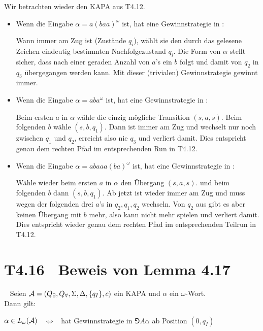 \documentclass[fontsize=11pt, twoside=false, numbers=autoenddot]{scrbook}
\begin{document}
Wir betrachten wieder den KAPA \Amc aus T4.12.
%
\parI
\begin{itemize}
  \item
    Wenn die Eingabe $\alpha = a(baa)^\omega$ ist,
    hat \PlE eine Gewinnstrategie in :
    
    \parI
    Wann immer \PlE am Zug ist (Zustände $q_i$),
    wählt sie den durch das gelesene Zeichen eindeutig bestimmten Nachfolgezustand $q_i$.
    Die Form von $\alpha$ stellt sicher, dass nach einer geraden Anzahl von $a$'s
    ein $b$ folgt und damit von $q_2$ in $q_3$ übergegangen werden kann.
    Mit dieser (trivialen) Gewinnstrategie gewinnt \PlE immer.
    \parI
  \item
    Wenn die Eingabe $\alpha = aba^\omega$ ist,
    hat \PlA eine Gewinnstrategie in :
    
    \parI
    Beim ersten $a$ in $\alpha$ wähle die einzig mögliche Transition $(s,a,s)$.
    Beim folgenden $b$ wähle $(s,b,q_1)$.
    Dann ist \PlE immer am Zug und wechselt nur noch zwischen $q_1$ und $q_2$,
    erreicht also nie $q_3$ und verliert damit.
    Dies entspricht genau dem rechten Pfad im entsprechenden Run in T4.12.
    \parI
  \item
    Wenn die Eingabe $\alpha = abaaa(ba)^\omega$ ist,
    hat \PlA eine Gewinnstrategie in :
    
    \parI
    Wähle wieder beim ersten $a$ in $\alpha$ den Übergang $(s,a,s)$.
    und beim folgenden $b$ dann $(s,b,q_1)$.
    Ab jetzt ist wieder \PlE immer am Zug und 
    muss wegen der folgenden drei $a$'s in $q_2,q_1,q_2$ wechseln.
    Von $q_2$ aus gibt es aber keinen Übergang mit $b$ mehr,
    also kann \PlE nicht mehr spielen und verliert damit.
    Dies entspricht wieder genau dem rechten Pfad im entsprechenden Teilrun in T4.12.
\end{itemize}

\section*{T4.16~ Beweis von Lemma 4.17}

~
Seien $\mathcal{A} = (Q_\exists,Q_\forall,\Sigma,\Delta,\{q_I\},c)$ ein KAPA
und $\alpha$ ein $\omega$-Wort. \\ %
Dann gilt:
%
\begin{center}
  $\alpha \in L_\omega(\mathcal{A})$ ~$\Leftrightarrow$~ \PlE hat Gewinnstrategie in $\Game{A}{\alpha}$ ab Position $(0,q_I)$
\end{center}
\end{document}
